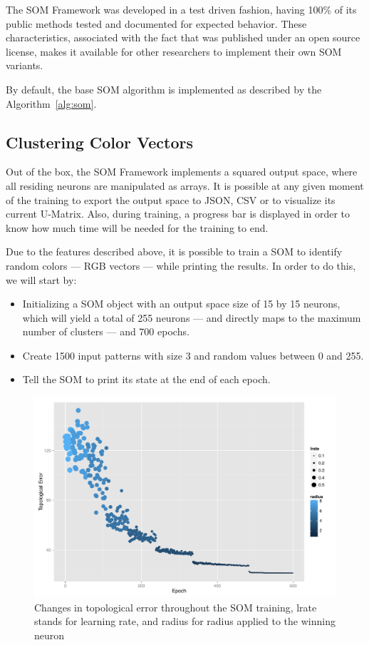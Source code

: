 \documentclass[journal]{IEEEtran}
\begin{document}
The \ac{SOM} Framework was developed in a test driven fashion, having 100\% of its public methods tested and documented for expected behavior. These characteristics, associated with the fact that was published under an open source license, makes it available for other researchers to implement their own SOM variants.

By default, the base SOM algorithm is implemented as described by the Algorithm~\ref{alg:som}.
\subsection{Clustering Color Vectors}
\label{sub:main_features}
Out of the box, the \ac{SOM} Framework implements a squared output space, where all residing neurons are manipulated as arrays. It is possible at any given moment of the training to export the output space to \ac{JSON}, \ac{CSV} or to visualize its current \ac{U-Matrix}. Also, during training, a progress bar is displayed in order to know how much time will be needed for the training to end.

Due to the features described above, it is possible to train a \ac{SOM} to identify random colors --- RGB vectors --- while printing the results. In order to do this, we will start by:
\begin{itemize}
  \item Initializing a SOM object with an output space size of 15 by 15 neurons, which will yield a total of 255 neurons --- and directly maps to the maximum number of clusters --- and 700 epochs.
  \item Create 1500 input patterns with size 3 and random values between 0 and 255. 
  \item Tell the SOM to print its state at the end of each epoch.
\end{itemize}

\begin{figure}[h]
  \centering
  \includegraphics[width=1\linewidth]{./plots/som/topological_error.pdf}
  \caption{Changes in topological error throughout the SOM training, lrate stands for learning rate, and radius for radius applied to the winning neuron}
  \label{fig:top_error}
\end{figure}
\end{document}
